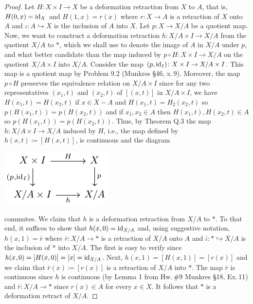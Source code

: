 \begin{proof}
Let $H\colon X\times I\to X$ be a deformation retraction from $X$ to $A$,
that is, $H(0,x)=\operatorname{id}_X$ and $H(1,x)=r(x)$ where $r\colon X\to A$ is a
retraction of $X$ onto $A$ and $\iota\colon A\hookrightarrow X$ is
the inclusion of $A$ into $X$. Let $p\colon X\to X/A$ be a quotient
map. Now, we want to construct a deformation retraction $h\colon X/A\times
I\to X/A$ from the quotient $X/A$ to $*$, which we shall use to denote the
image of $A$ in $X/A$ under $p$, and what better candidate than the map
induced by $p\circ H\colon X\times I\to X/A$ on the quotient $X/A\times
I$ into $X/A$. Consider the map $(p,\operatorname{id}_I)\colon X\times I\to X/A\times
I$. This map is a quotient map by Problem 9.2 (Munkres \S46,
x.\,9). Moreover, the map $p\circ H$ preserves the equivalence relation on
$X/A\times I$ since for any two representatives $(x_1,t)$ and $(x_2,t)$ of
$[(x,t)]$ in $X/A\times I$, we have $H(x_1,t)=H(x_2,t)$ if $x\in X-A$ and
$H(x_1,t)=H_2(x_2,t)$ so $p(H(x_1,t))=p(H(x_2,t))$ and if $x_1,x_2\in
A$ then $H(x_1,t),H(x_2,t)\in A$ so $p(H(x_1,t))=p(H(x_2,t))$. Thus, by
Theorem Q.3 the map $h\colon X/A\times I\to X/A$ induced by $H$, i.e., the
map defined  by $h(x,t)\coloneqq[H(x,t)]$, is continuous and the diagram
\begin{center}
\includegraphics{figures/hw-11-def-retract}
\end{center}
commutes. We claim that $h$ is a deformation retraction from $X/A$ to
$*$. To that end, it suffices to show that $h(x,0)=\operatorname{id}_{X/A}$ and, using
suggestive notation, $h(x,1)=\bar r$ where $\bar r\colon X/A\to *$ is a
retraction of $X/A$ onto $A$ and $\bar\iota\colon *\hookrightarrow X/A$ is
the inclusion of $*$ into $X/A$. The first is easy to verify since
$h(x,0)=[H(x,0)]=[x]=\operatorname{id}_{X/A}$. Next, $h(x,1)=[H(x,1)]=[r(x)]$ and we
claim that $\bar r(x)\coloneqq [r(x)]$ is a retraction of $X/A$ into
$*$. The map $\bar r$ is continuous since $h$ is continuous (by Lemma 1
from Hw.\,\#9 Munkres \S18, Ex.\,11) and $\bar r\colon X/A\to *$ since
$r(x)\in A$ for every $x\in X$. It follows that $*$ is a deformation
retract of $X/A$.
\end{proof}


